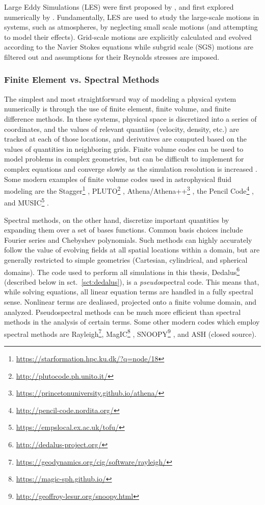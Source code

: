 Large Eddy Simulations (LES) were first proposed by \cite{smagorinsky1963}, and first explored numerically by \citet{deardorff1970}.
Fundamentally, LES are used to study the large-scale motions in systems, such as atmospheres, by neglecting small scale motions (and attempting to model their effects).
Grid-scale motions are explicitly calculated and evolved according to the Navier Stokes equations while subgrid scale (SGS) motions are filtered out and assumptions for their Reynolds stresses are imposed.

\subsubsection{Finite Element vs. Spectral Methods}
The simplest and most straightforward way of modeling a physical system numerically is through the use of finite element, finite volume, and finite difference methods.
In these systems, physical space is discretized into a series of coordinates, and the values of relevant quantiies (velocity, density, etc.) are tracked at each of those locations, and derivatives are computed based on the values of quantities in neighboring grids.
Finite volume codes can be used to model problems in complex geometries, but can be difficult to implement for complex equations and converge slowly as the simulation resolution is increased \citep{burns&all2019}.
Some modern examples of finite volume codes used in astrophysical fluid modeling are the Stagger\footnote{\url{https://starformation.hpc.ku.dk/?q=node/18}} \citep{galsgaard2011}, PLUTO\footnote{\url{http://plutocode.ph.unito.it/}} \citep{mignone&all2012}, Athena/Athena++\footnote{\url{https://princetonuniversity.github.io/athena/}} \citep{stone&all2008, stone&all2019}, the Pencil Code\footnote{\url{http://pencil-code.nordita.org/}} \citep{brandenburg&dobler2010}, and MUSIC\footnote{\url{https://empslocal.ex.ac.uk/tofu/}} \citep{goffrey&all2017}.

Spectral methods, on the other hand, discretize important quantities by expanding them over a set of bases functions.
Common basis choices include Fourier series and Chebyshev polynomials.
Such methods can highly accurately follow the value of evolving fields at all spatial locations within a domain, but are generally restricted to simple geometries (Cartesian, cylindrical, and spherical domains).
The code used to perform all simulations in this thesis, Dedalus\footnote{\url{http://dedalus-project.org/}} (described below in sct.~\ref{sct:dedalus}), is a \emph{pseudo}spectral code.
This means that, while solving equations, all linear equation terms are handled in a fully spectral sense.
Nonlinear terms are dealiased, projected onto a finite volume domain, and analyzed. 
Pseudospectral methods can be much more efficient than spectral methods in the analysis of certain terms.
Some other modern codes which employ spectral methods are Rayleigh\footnote{\url{https://geodynamics.org/cig/software/rayleigh/}}, MagIC\footnote{\url{https://magic-sph.github.io/}} \citep{wicht&all2017}, SNOOPY\footnote{\url{http://geoffroy-lesur.org/snoopy.html}} \citep{lesur2015}, and ASH (closed source).


